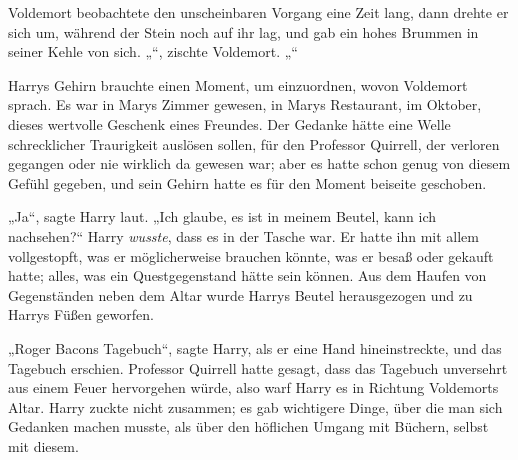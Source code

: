Voldemort beobachtete den unscheinbaren Vorgang eine Zeit lang, dann drehte er sich um, während der Stein noch auf ihr lag, und gab ein hohes Brummen in seiner Kehle von sich.
„“, zischte Voldemort. „“

Harrys Gehirn brauchte einen Moment, um einzuordnen, wovon Voldemort sprach.
Es war in Marys Zimmer gewesen, in Marys Restaurant, im Oktober, dieses wertvolle Geschenk eines Freundes. Der Gedanke hätte eine Welle schrecklicher Traurigkeit auslösen sollen, für den Professor Quirrell, der verloren gegangen oder nie wirklich da gewesen war; aber es hatte schon genug von diesem Gefühl gegeben, und sein Gehirn hatte es für den Moment beiseite geschoben.

„Ja“, sagte Harry laut. „Ich glaube, es ist in meinem Beutel, kann ich nachsehen?“
Harry \emph{wusste}, dass es in der Tasche war. Er hatte ihn mit allem vollgestopft, was er möglicherweise brauchen könnte, was er besaß oder gekauft hatte; alles, was ein Questgegenstand hätte sein können.
Aus dem Haufen von Gegenständen neben dem Altar wurde Harrys Beutel herausgezogen und zu Harrys Füßen geworfen.

„Roger Bacons Tagebuch“, sagte Harry, als er eine Hand hineinstreckte, und das Tagebuch erschien. Professor Quirrell hatte gesagt, dass das Tagebuch unversehrt aus einem Feuer hervorgehen würde, also warf Harry es in Richtung Voldemorts Altar.
Harry zuckte nicht zusammen; es gab wichtigere Dinge, über die man sich Gedanken machen musste, als über den höflichen Umgang mit Büchern, selbst mit diesem.

